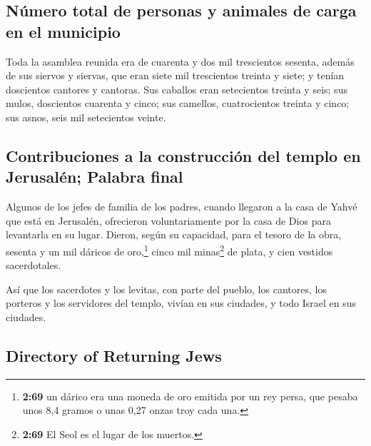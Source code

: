 \begin{paracol}{2}
\hypertarget{nuxfamero-total-de-personas-y-animales-de-carga-en-el-municipio}{%
\subsection{Número total de personas y animales de carga en el
municipio}\label{nuxfamero-total-de-personas-y-animales-de-carga-en-el-municipio}}

 Toda la asamblea reunida era de cuarenta y dos mil
trescientos sesenta,  además de sus siervos y siervas,
que eran siete mil trescientos treinta y siete; y tenían doscientos
cantores y cantoras.  Sus caballos eran setecientos
treinta y seis; sus mulos, doscientos cuarenta y cinco; 
sus camellos, cuatrocientos treinta y cinco; sus asnos, seis mil
setecientos veinte.

\hypertarget{contribuciones-a-la-construcciuxf3n-del-templo-en-jerusaluxe9n-palabra-final}{%
\subsection{Contribuciones a la construcción del templo en Jerusalén;
Palabra
final}\label{contribuciones-a-la-construcciuxf3n-del-templo-en-jerusaluxe9n-palabra-final}}

 Algunos de los jefes de familia de los padres, cuando
llegaron a la casa de Yahvé que está en Jerusalén, ofrecieron
voluntariamente por la casa de Dios para levantarla en su lugar.
 Dieron, según su capacidad, para el tesoro de la obra,
sesenta y un mil dáricos de oro,\footnote{\textbf{2:69} un dárico era
  una moneda de oro emitida por un rey persa, que pesaba unos 8,4 gramos
  o unas 0,27 onzas troy cada una.} cinco mil minas\footnote{\textbf{2:69}
  El Seol es el lugar de los muertos.} de plata, y cien vestidos
sacerdotales.

 Así que los sacerdotes y los levitas, con parte del
pueblo, los cantores, los porteros y los servidores del templo, vivían
en sus ciudades, y todo Israel en sus ciudades.

\switchcolumn
\begin{otherlanguage}{english}

\hypertarget{directory-of-returning-jews}{%
\subsection{Directory of Returning
Jews}\label{directory-of-returning-jews}}


\end{otherlanguage}
\end{paracol}

